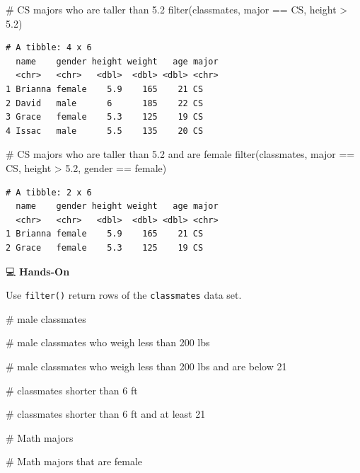 \documentclass[
  letterpaper,
  DIV=11,
  numbers=noendperiod]{scrreprt}
\newenvironment{Shaded}{\begin{snugshade}}{\end{snugshade}}
\newcommand{\CommentTok}[1]{\textcolor[rgb]{0.37,0.37,0.37}{#1}}
\newcommand{\FloatTok}[1]{\textcolor[rgb]{0.68,0.00,0.00}{#1}}
\newcommand{\FunctionTok}[1]{\textcolor[rgb]{0.28,0.35,0.67}{#1}}
\newcommand{\NormalTok}[1]{\textcolor[rgb]{0.00,0.23,0.31}{#1}}
\newcommand{\SpecialCharTok}[1]{\textcolor[rgb]{0.37,0.37,0.37}{#1}}
\newcommand{\StringTok}[1]{\textcolor[rgb]{0.13,0.47,0.30}{#1}}
\begin{document}
\begin{Shaded}
\begin{Highlighting}[]
\CommentTok{\# CS majors who are taller than 5.2}
\FunctionTok{filter}\NormalTok{(classmates, major }\SpecialCharTok{==} \StringTok{\textquotesingle{}CS\textquotesingle{}}\NormalTok{, height }\SpecialCharTok{\textgreater{}} \FloatTok{5.2}\NormalTok{)}
\end{Highlighting}
\end{Shaded}

\begin{verbatim}
# A tibble: 4 x 6
  name    gender height weight   age major
  <chr>   <chr>   <dbl>  <dbl> <dbl> <chr>
1 Brianna female    5.9    165    21 CS   
2 David   male      6      185    22 CS   
3 Grace   female    5.3    125    19 CS   
4 Issac   male      5.5    135    20 CS   
\end{verbatim}

\begin{Shaded}
\begin{Highlighting}[]
\CommentTok{\# CS majors who are taller than 5.2 and are female}
\FunctionTok{filter}\NormalTok{(classmates, major }\SpecialCharTok{==} \StringTok{\textquotesingle{}CS\textquotesingle{}}\NormalTok{, height }\SpecialCharTok{\textgreater{}} \FloatTok{5.2}\NormalTok{, gender }\SpecialCharTok{==} \StringTok{\textquotesingle{}female\textquotesingle{}}\NormalTok{)}
\end{Highlighting}
\end{Shaded}

\begin{verbatim}
# A tibble: 2 x 6
  name    gender height weight   age major
  <chr>   <chr>   <dbl>  <dbl> <dbl> <chr>
1 Brianna female    5.9    165    21 CS   
2 Grace   female    5.3    125    19 CS   
\end{verbatim}

💻 \textbf{Hands-On}

Use \texttt{filter()} return rows of the \texttt{classmates} data set.

\begin{Shaded}
\begin{Highlighting}[]
\CommentTok{\# male classmates}

\CommentTok{\# male classmates who weigh less than 200 lbs}

\CommentTok{\# male classmates who weigh less than 200 lbs and are below 21}

\CommentTok{\# classmates shorter than 6 ft}

\CommentTok{\# classmates shorter than 6 ft and at least 21}

\CommentTok{\# Math majors}

\CommentTok{\# Math majors that are female}
\end{Highlighting}
\end{Shaded}
\end{document}
